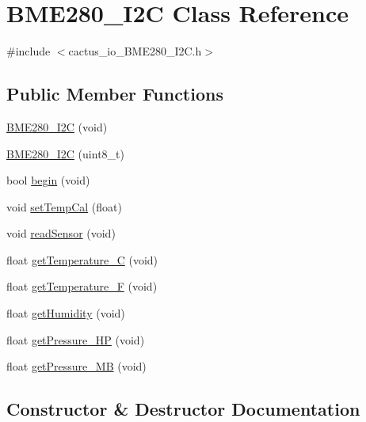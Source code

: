 \hypertarget{class_b_m_e280___i2_c}{}\section{B\+M\+E280\+\_\+\+I2C Class Reference}
\label{class_b_m_e280___i2_c}


{\ttfamily \#include $<$cactus\+\_\+io\+\_\+\+B\+M\+E280\+\_\+\+I2\+C.\+h$>$}

\subsection*{Public Member Functions}
\begin{DoxyCompactItemize}
\item 
\hyperlink{class_b_m_e280___i2_c_a6011ec1fdda024a28e3b3c4563dd19ce}{B\+M\+E280\+\_\+\+I2C} (void)
\item 
\hyperlink{class_b_m_e280___i2_c_a1a304db709f2984767feb9bc91a1b17b}{B\+M\+E280\+\_\+\+I2C} (uint8\+\_\+t)
\item 
bool \hyperlink{class_b_m_e280___i2_c_ae3831ecd83ad52e596729515cbd96a5a}{begin} (void)
\item 
void \hyperlink{class_b_m_e280___i2_c_a56de2784c69f2877300e26b7fc9f1f68}{set\+Temp\+Cal} (float)
\item 
void \hyperlink{class_b_m_e280___i2_c_a2baea1941d361762283547f2ff646bc3}{read\+Sensor} (void)
\item 
float \hyperlink{class_b_m_e280___i2_c_aea7c673234614f67d67cd7c776204ef2}{get\+Temperature\+\_\+C} (void)
\item 
float \hyperlink{class_b_m_e280___i2_c_a992a5e6a609aa5f3bd35f074f6b054f4}{get\+Temperature\+\_\+F} (void)
\item 
float \hyperlink{class_b_m_e280___i2_c_ac36ed5661f5058655817c912c2fa18e3}{get\+Humidity} (void)
\item 
float \hyperlink{class_b_m_e280___i2_c_ae9ef7ca41ed5fc2779ae5d5ec5767757}{get\+Pressure\+\_\+\+HP} (void)
\item 
float \hyperlink{class_b_m_e280___i2_c_a9fbfdbf2788663d691f330ea06853f93}{get\+Pressure\+\_\+\+MB} (void)
\end{DoxyCompactItemize}


\subsection{Constructor \& Destructor Documentation}
\mbox{\label{class_b_m_e280___i2_c_a6011ec1fdda024a28e3b3c4563dd19ce}} 
